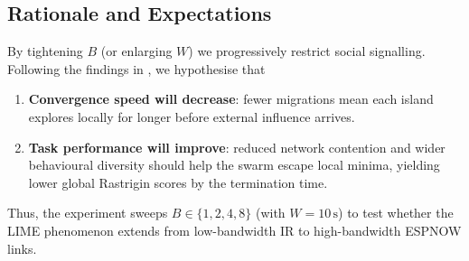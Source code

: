 \documentclass[conference]{IEEEtran}
\begin{document}
\subsection{Rationale and Expectations}

By tightening $B$ (or enlarging $W$) we progressively restrict social signalling.  
Following the findings in \cite{aust2022hidden}, we hypothesise that

\begin{enumerate}
  \item \textbf{Convergence speed will decrease}: fewer migrations mean each island explores locally for longer before external influence arrives.
  \item \textbf{Task performance will improve}: reduced network contention and wider behavioural diversity should help the swarm escape local minima, yielding lower global Rastrigin scores by the termination time.
\end{enumerate}

Thus, the experiment sweeps $B\in\{1,2,4,8\}$ (with $W=10\,\mathrm{s}$) to test whether the LIME phenomenon extends from low-bandwidth IR to high-bandwidth ESPNOW links.





\newpage
\printbibliography
\end{document}
